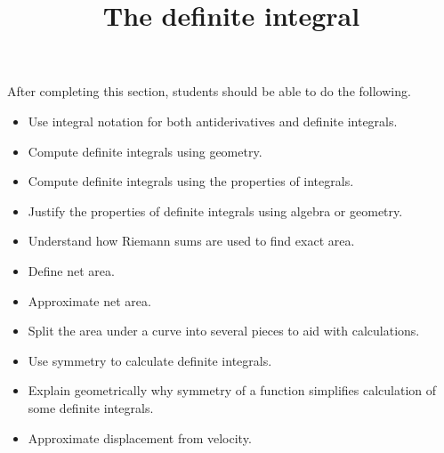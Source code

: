 \documentclass{ximera}
\title{The definite integral}
\begin{document}
\begin{abstract}
\end{abstract}

\maketitle

\begin{sectionOutcomes}

After completing this section, students should be able to do the following.

\begin{itemize}
\item Use integral notation for both antiderivatives and definite integrals.
\item Compute definite integrals using geometry.
\item Compute definite integrals using the properties of integrals.
\item Justify the properties of definite integrals using algebra or geometry.
\item Understand how Riemann sums are used to find exact area.
\item Define net area.
\item Approximate net area.
\item Split the area under a curve into several pieces to aid with calculations.
\item Use symmetry to calculate definite integrals.
\item Explain geometrically why symmetry of a function simplifies calculation of some definite integrals.
\item Approximate displacement from velocity.
\end{itemize}

\end{sectionOutcomes}
\end{document}
